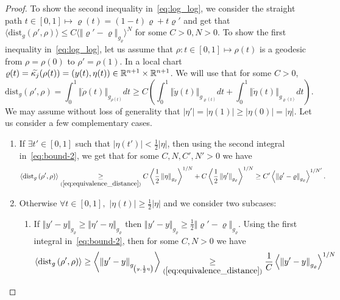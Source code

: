 \documentclass[AHL,Unicode,longabstracts,published]{cedram}
\newcommand*\ineqs[1]{\underset{(#1)}{\geq}}
\newcommand{\dist}{\mathrm{dist}}
\newcommand{\bbR}{\mathbb{R}}
\let\oldtilde\tilde
\renewcommand*{\tilde}[1]{\mathchoice{\widetilde{#1}}{\widetilde{#1}}{\oldtilde{#1}}{\oldtilde{#1}}}
\let\oldexists\exists
\renewcommand*{\exists}{\mathrel{\oldexists}}
\let\oldforall\forall
\renewcommand*{\forall}{\mathrel{\oldforall}}
\newcommand{\bbR}{\mathbb{R}}
\begin{document}
\begin{proof}
To show the second inequality in~\eqref{eq:log_log}, we consider the straight path $t\in[0,1]\mapsto\varrho(t)=(1-t)\varrho+t\varrho'$ and get that $\langle \dist_{g}(\rho',\rho)\rangle \leq C\langle \Vert \varrho'-\varrho\Vert _{g_{\varrho}}\rangle^{N}$ for some $C>0,N>0$. To show the first inequality in~\eqref{eq:log_log}, let us assume that $\rho:t\in[0,1]\mapsto\rho(t)$ is a geodesic from $\rho=\rho(0)$ to $\rho'=\rho(1)$. In a local chart $\varrho(t)=\tilde{\kappa_{j}}(\rho(t))=(y(t),\eta(t))\in\bbR^{n+1}\times\bbR^{n+1}$. We will use that for some $C>0$,
\begin{equation}\label{eq:bound-2}
\dist_{g}\left(\rho',\rho\right)
=\int_{0}^{1}\left\Vert \dot{\rho}\left(t\right)\right\Vert _{g_{\rho\left(t\right)}}dt
\geq C\left(\int_{0}^{1}\left\Vert \dot{y}\left(t\right)\right\Vert _{g_{\varrho\left(t\right)}}dt+\int_{0}^{1}\left\Vert \dot{\eta}\left(t\right)\right\Vert _{g_{\varrho\left(t\right)}}dt\right).
\end{equation}
We may assume without loss of generality that $|\eta'|=|\eta(1)|\geq|\eta(0)|=|\eta|$. Let us consider a few complementary cases.
\begin{enumerate}
\item If $\exists t'\in[0,1]$ such that $|\eta(t')|<\frac{1}{2}|\eta|$, then using the second integral in~\eqref{eq:bound-2}, we get that for some $C,N,C',N'>0$ we have
\[
\left\langle \dist_{g}\left(\rho',\rho\right)\right\rangle \ineqs{\ref{eq:equivalence_distance}}C\left\langle \frac{1}{2}\left\Vert \eta\right\Vert _{g_{\varrho}}\right\rangle ^{1/N}+C\left\langle \frac{1}{2}\left\Vert \eta'\right\Vert _{g_{\varrho}}\right\rangle ^{1/N}\geq C'\left\langle \left\Vert \varrho'-\varrho\right\Vert _{g_{\varrho}}\right\rangle ^{1/N'}.
\]
\item Otherwise $\forall t\in[0,1],$ $|\eta(t)|\geq\frac{1}{2}|\eta|$ and we consider two subcases:
\begin{enumerate}
\item If $\Vert y'-y\Vert _{g_{\varrho}}\geq\Vert \eta'-\eta\Vert _{g_{\varrho}}$ then $\Vert y'-y\Vert _{g_{\varrho}}\geq\frac{1}{2}\Vert \varrho'-\varrho\Vert _{g_{\varrho}}$. Using the first integral in~\eqref{eq:bound-2}, then for some $C,N>0$ we have
\begin{align*}
\left\langle \dist_{g}\left(\rho',\rho\right)\right\rangle & \geq\left\langle \left\Vert y'-y\right\Vert _{g_{\left(y,\frac{1}{2}\eta\right)}}\right\rangle \ineqs{\ref{eq:equivalence_distance}}\frac{1}{C}\left\langle \left\Vert y'-y\right\Vert _{g_{\varrho}}\right\rangle ^{1/N}\\

\end{align*}
\end{enumerate}
\end{enumerate}
\end{proof}
\end{document}
